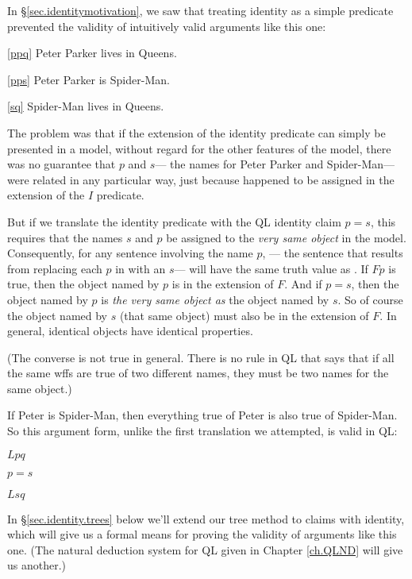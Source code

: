 In \S\ref{sec.identitymotivation}, we saw that treating identity as a simple predicate prevented the validity of intuitively valid arguments like  this one:

\begin{earg}
\item[\ref{ppq}] Peter Parker lives in Queens.
\item[\ref{pps}] Peter Parker is Spider-Man.
\item[\ref{sq}] Spider-Man lives in Queens.
\end{earg}

The problem was that if the extension of the identity predicate can simply be presented in a model, without regard for the other features of the model, there was no guarantee that $p$ and $s$--- the names for Peter Parker and Spider-Man--- were related in any particular way, just because  happened to be assigned in the extension of the $I$ predicate.

But if we translate the identity predicate with the QL identity claim $p{=}s$, this requires that the names $s$ and $p$ be assigned to the \emph{very same object} in the model. Consequently, for any sentence \metaA{} involving the name $p$, \metaA{}--- the sentence that results from replacing each $p$ in \metaA{} with an $s$--- will have the same truth value as \metaA{}. If $Fp$ is true, then the object named by $p$ is in the extension of $F$. And if $p{=}s$, then the object named by $p$ is \emph{the very same object as} the object named by $s$. So of course the object named by $s$ (that same object) must also be in the extension of $F$. In general, identical objects have identical properties.

(The converse is not true in general. There is no rule in QL that says that if all the same wffs are true of two different names, they must be two names for the same object.)

If Peter is Spider-Man, then everything true of Peter is also true of Spider-Man. So this argument form, unlike the first translation we attempted, is valid in QL:

\begin{earg}
\item[] $Lpq$
\item[] $p{=}s$
\item[\therefore] $Lsq$
\end{earg}

In \S\ref{sec.identity.trees} below we'll extend our tree method to claims with identity, which will give us a formal means for proving the validity of arguments like this one. (The natural deduction system for QL given in Chapter \ref{ch.QLND} will give us another.)





